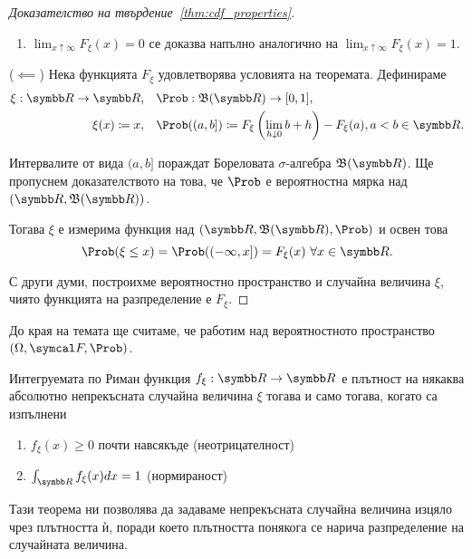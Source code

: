 \documentclass[numbers=endperiod, bibliography=totocnumbered]{scrartcl}
\begin{document}
\begin{proof}[Доказателство на твърдение~\ref{thm:cdf_properties}]
\begin{enumerate}
    \item \( \lim_{x \uparrow \infty} F_\xi(x) = 0 \) се доказва напълно аналогично на \( \lim_{x \uparrow \infty} F_\xi(x) = 1 \).
  \end{enumerate}

  (\( \impliedby \)) Нека функцията \( F_\xi \) удовлетворява условията на теоремата. Дефинираме
  \begin{align*}
    \xi: \R \to \R,     &&& \Prob: \BorelAlgebra(\R) \to [0, 1], \\
    \xi(x) \coloneqq x, &&& \Prob((a, b]) \coloneqq F_\xi \left(\lim_{h \downarrow 0} b + h \right) - F_\xi(a), a < b \in \R.
  \end{align*}

  Интервалите от вида \( (a, b] \) пораждат Бореловата \( \sigma \)-алгебра \( \BorelAlgebra(\R) \). Ще пропуснем доказателството на това, че \( \Prob \) е вероятностна мярка над \( (\R, \BorelAlgebra(\R)) \).

  Тогава \( \xi \) е измерима функция над \( (\R, \BorelAlgebra(\R), \Prob) \) и освен това
  \begin{equation*}
    \Prob(\xi \leq x)
    =
    \Prob((-\infty, x])
    =
    F_\xi(x)~\forall x \in \R.
  \end{equation*}

  С други думи, построихме вероятностно пространство и случайна величина \( \xi \), чиято функцията на разпределение е \( F_\xi \).
\end{proof}

До края на темата ще считаме, че работим над вероятностното пространство \( (\Omega, \F, \Prob) \).

\begin{theorem}\label{thm:density_properties}
  Интегруемата по Риман функция \( f_\xi: \R \to \R \) е плътност на някаква абсолютно непрекъсната случайна величина \( \xi \) тогава и само тогава, когато са изпълнени
  \begin{enumerate}
    \item \( f_\xi(x) \geq 0 \) почти навсякъде (неотрицателност)
    \item \( \int_{\R} f_\xi(x) dx = 1 \) (нормираност)
  \end{enumerate}
\end{theorem}

Тази теорема ни позволява да задаваме непрекъсната случайна величина изцяло чрез плътността ѝ, поради което плътността понякога се нарича разпределение на случайната величина.
\end{document}

